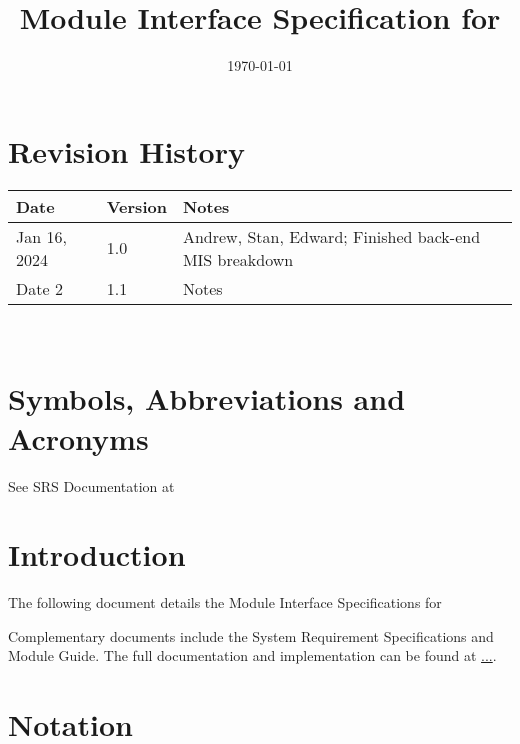 \documentclass[12pt, titlepage]{article}
\begin{document}
\title{Module Interface Specification for \progname{}}

\author{\authname}

\date{\today}

\maketitle


\section{Revision History}

\begin{tabularx}{\textwidth}{p{3cm}p{2cm}X}
\toprule {\bf Date} & {\bf Version} & {\bf Notes}\\
\midrule
Jan 16, 2024 & 1.0 & Andrew, Stan, Edward; Finished back-end MIS breakdown\\
Date 2 & 1.1 & Notes\\
\bottomrule
\end{tabularx}

~\newpage

\section{Symbols, Abbreviations and Acronyms}

See SRS Documentation at 


\newpage

\tableofcontents

\newpage


\section{Introduction}

The following document details the Module Interface Specifications for

Complementary documents include the System Requirement Specifications
and Module Guide.  The full documentation and implementation can be
found at \url{...}.  

\section{Notation}
\end{document}
